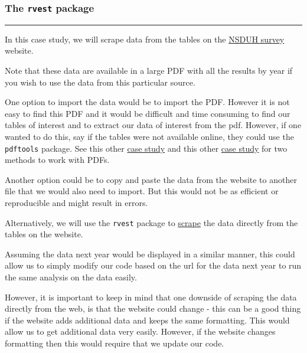\documentclass[
]{article}
\begin{document}
\hypertarget{section-15}{%
\paragraph{}\label{section-15}}

\hypertarget{the-rvest-package}{%
\subsubsection{\texorpdfstring{\textbf{The \texttt{rvest}
package}}{The rvest package}}\label{the-rvest-package}}

\begin{center}\rule{0.5\linewidth}{0.5pt}\end{center}

In this case study, we will scrape data from the tables on the
\href{https://www.samhsa.gov/data/sites/default/files/cbhsq-reports/NSDUHDetailedTabs2018R2/NSDUHDetTabsSect11pe2018.htm}{NSDUH
survey} website.

Note that these data are available in a large PDF with all the results
by year if you wish to use the data from this particular source.

One option to import the data would be to import the PDF. However it is
not easy to find this PDF and it would be difficult and time consuming
to find our tables of interest and to extract our data of interest from
the pdf. However, if one wanted to do this, say if the tables were not
available online, they could use the \texttt{pdftools} package. See this
other \href{https://www.opencasestudies.org/ocs-bp-diet/}{case study}
and this other
\href{https://www.opencasestudies.org/ocs-bp-youth-disconnection/}{case
study} for two methods to work with PDFs.

Another option could be to copy and paste the data from the website to
another file that we would also need to import. But this would not be as
efficient or reproducible and might result in errors.

Alternatively, we will use the \texttt{rvest} package to
\href{https://en.wikipedia.org/wiki/Web_scraping?oldformat=true}{scrape}
the data directly from the tables on the website.

Assuming the data next year would be displayed in a similar manner, this
could allow us to simply modify our code based on the url for the data
next year to run the same analysis on the data easily.

However, it is important to keep in mind that one downside of scraping
the data directly from the web, is that the website could change - this
can be a good thing if the website adds additional data and keeps the
same formatting. This would allow us to get additional data very easily.
However, if the website changes formatting then this would require that
we update our code.
\end{document}

